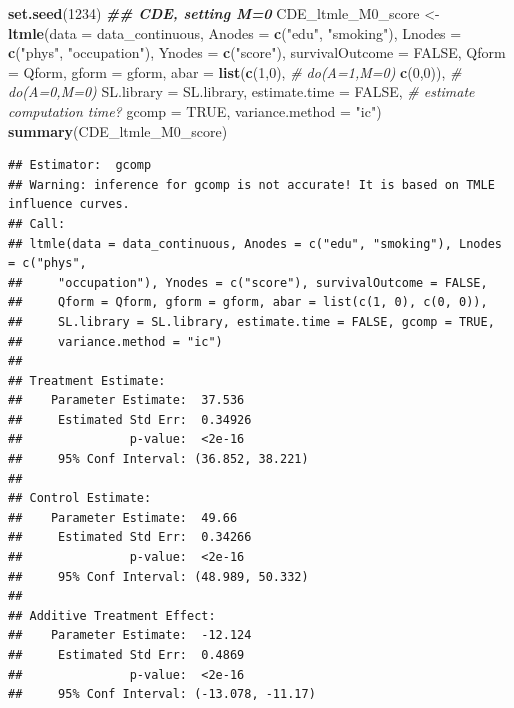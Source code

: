 \documentclass[
]{book}
\newenvironment{Shaded}{\begin{snugshade}}{\end{snugshade}}
\newcommand{\AttributeTok}[1]{\textcolor[rgb]{0.13,0.29,0.53}{#1}}
\newcommand{\CommentTok}[1]{\textcolor[rgb]{0.56,0.35,0.01}{\textit{#1}}}
\newcommand{\ConstantTok}[1]{\textcolor[rgb]{0.56,0.35,0.01}{#1}}
\newcommand{\DecValTok}[1]{\textcolor[rgb]{0.00,0.00,0.81}{#1}}
\newcommand{\DocumentationTok}[1]{\textcolor[rgb]{0.56,0.35,0.01}{\textbf{\textit{#1}}}}
\newcommand{\FunctionTok}[1]{\textcolor[rgb]{0.13,0.29,0.53}{\textbf{#1}}}
\newcommand{\NormalTok}[1]{#1}
\newcommand{\OtherTok}[1]{\textcolor[rgb]{0.56,0.35,0.01}{#1}}
\newcommand{\StringTok}[1]{\textcolor[rgb]{0.31,0.60,0.02}{#1}}
\begin{document}
\begin{Shaded}
\begin{Highlighting}[]
\FunctionTok{set.seed}\NormalTok{(}\DecValTok{1234}\NormalTok{)}
\DocumentationTok{\#\# CDE, setting M=0}
\NormalTok{CDE\_ltmle\_M0\_score }\OtherTok{\textless{}{-}} \FunctionTok{ltmle}\NormalTok{(}\AttributeTok{data =}\NormalTok{ data\_continuous,}
                            \AttributeTok{Anodes =} \FunctionTok{c}\NormalTok{(}\StringTok{"edu"}\NormalTok{, }\StringTok{"smoking"}\NormalTok{),}
                            \AttributeTok{Lnodes =} \FunctionTok{c}\NormalTok{(}\StringTok{"phys"}\NormalTok{, }\StringTok{"occupation"}\NormalTok{), }
                            \AttributeTok{Ynodes =} \FunctionTok{c}\NormalTok{(}\StringTok{"score"}\NormalTok{),}
                            \AttributeTok{survivalOutcome =} \ConstantTok{FALSE}\NormalTok{, }
                            \AttributeTok{Qform =}\NormalTok{ Qform,}
                            \AttributeTok{gform =}\NormalTok{ gform,}
                            \AttributeTok{abar =} \FunctionTok{list}\NormalTok{(}\FunctionTok{c}\NormalTok{(}\DecValTok{1}\NormalTok{,}\DecValTok{0}\NormalTok{), }\CommentTok{\# do(A=1,M=0)}
                                        \FunctionTok{c}\NormalTok{(}\DecValTok{0}\NormalTok{,}\DecValTok{0}\NormalTok{)), }\CommentTok{\#  do(A=0,M=0)}
                            \AttributeTok{SL.library =}\NormalTok{ SL.library,}
                            \AttributeTok{estimate.time =} \ConstantTok{FALSE}\NormalTok{, }\CommentTok{\# estimate computation time?}
                            \AttributeTok{gcomp =} \ConstantTok{TRUE}\NormalTok{,}
                            \AttributeTok{variance.method =} \StringTok{"ic"}\NormalTok{)}
\FunctionTok{summary}\NormalTok{(CDE\_ltmle\_M0\_score)}
\end{Highlighting}
\end{Shaded}

\begin{verbatim}
## Estimator:  gcomp 
## Warning: inference for gcomp is not accurate! It is based on TMLE influence curves.
## Call:
## ltmle(data = data_continuous, Anodes = c("edu", "smoking"), Lnodes = c("phys", 
##     "occupation"), Ynodes = c("score"), survivalOutcome = FALSE, 
##     Qform = Qform, gform = gform, abar = list(c(1, 0), c(0, 0)), 
##     SL.library = SL.library, estimate.time = FALSE, gcomp = TRUE, 
##     variance.method = "ic")
## 
## Treatment Estimate:
##    Parameter Estimate:  37.536 
##     Estimated Std Err:  0.34926 
##               p-value:  <2e-16 
##     95% Conf Interval: (36.852, 38.221) 
## 
## Control Estimate:
##    Parameter Estimate:  49.66 
##     Estimated Std Err:  0.34266 
##               p-value:  <2e-16 
##     95% Conf Interval: (48.989, 50.332) 
## 
## Additive Treatment Effect:
##    Parameter Estimate:  -12.124 
##     Estimated Std Err:  0.4869 
##               p-value:  <2e-16 
##     95% Conf Interval: (-13.078, -11.17)
\end{verbatim}
\end{document}
